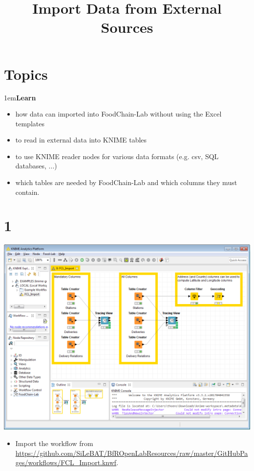 \documentclass[10pt]{beamer}
\title{Import Data from External Sources}
\date{}
\begin{document}
\maketitle

\section{Topics}
\begin{frame}
\leftskip1em\textbf{Learn}
	\begin{itemize}
		\item how data can imported into FoodChain-Lab without using the Excel templates
		\item to read in external data into KNIME tables
		\item to use KNIME reader nodes for various data formats (e.g. csv, SQL databases, ...)
		\item which tables are needed by FoodChain-Lab and which columns they must contain.
	\end{itemize}
\end{frame}

\section{1}
\begin{frame}
	\begin{center}
  		\includegraphics[height=0.6\textheight]{1.png}
	\end{center}
	\begin{itemize}
		\item Import the workflow from \url{https://github.com/SiLeBAT/BfROpenLabResources/raw/master/GitHubPages/workflows/FCL_Import.knwf}.
	\end{itemize}
\end{frame}
\end{document}
